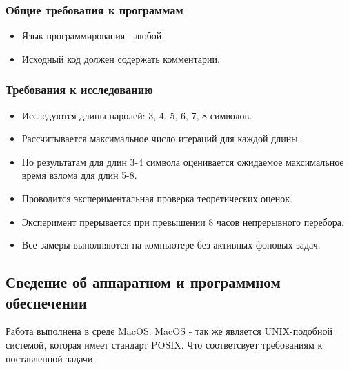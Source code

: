 \documentclass[areasetadvanced]{scrartcl}
\begin{document}
\subsubsection{Общие требования к программам}
\begin{itemize}
    \item Язык программирования - любой.
    \item Исходный код должен содержать комментарии.
\end{itemize}

\subsubsection{Требования к исследованию}
\begin{itemize}
    \item Исследуются длины паролей: 3, 4, 5, 6, 7, 8 символов.
    \item Рассчитывается максимальное число итераций для каждой длины.
    \item По результатам для длин 3-4 символа оценивается ожидаемое максимальное время взлома для длин 5-8.
    \item Проводится экспериментальная проверка теоретических оценок.
    \item Эксперимент прерывается при превышении 8 часов непрерывного перебора.
    \item Все замеры выполняются на компьютере без активных фоновых задач.
\end{itemize}
\subsection{Сведение об аппаратном и программном обеспечении}

Работа выполнена в среде MacOS. MacOS - так же является UNIX-подобной системой, которая имеет стандарт POSIX.
Что соответсвует требованиям к поставленной задачи. 
\end{document}
